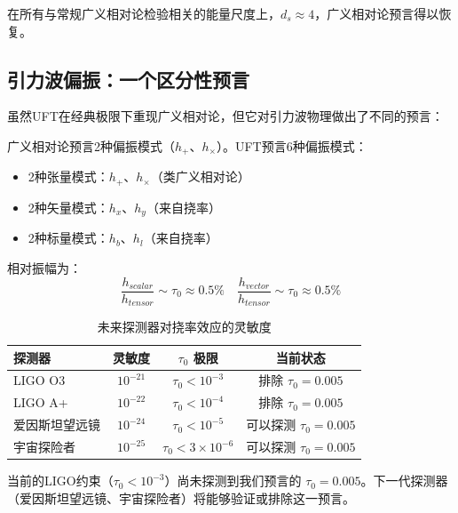 在所有与常规广义相对论检验相关的能量尺度上，$d_s \approx 4$，广义相对论预言得以恢复。

\subsection{引力波偏振：一个区分性预言}

虽然UFT在经典极限下重现广义相对论，但它对引力波物理做出了不同的预言：

\begin{theorem}[引力波偏振]
广义相对论预言2种偏振模式（$h_+$、$h_\times$）。UFT预言6种偏振模式：
\begin{itemize}
    \item 2种张量模式：$h_+$、$h_\times$（类广义相对论）
    \item 2种矢量模式：$h_x$、$h_y$（来自挠率）
    \item 2种标量模式：$h_b$、$h_l$（来自挠率）
\end{itemize}
\end{theorem}

相对振幅为：
\begin{equation}
    \frac{h_{scalar}}{h_{tensor}} \sim \tau_0 \approx 0.5\%
    \quad
    \frac{h_{vector}}{h_{tensor}} \sim \tau_0 \approx 0.5\%
\end{equation}

\begin{table}[htbp]
\centering
\caption{未来探测器对挠率效应的灵敏度}
\begin{tabular}{@{}lccc@{}}
\toprule
探测器 & 灵敏度 & $\tau_0$ 极限 & 当前状态 \\
\midrule
LIGO O3 & $10^{-21}$ & $\tau_0 < 10^{-3}$ & 排除 $\tau_0 = 0.005$ \\
LIGO A+ & $10^{-22}$ & $\tau_0 < 10^{-4}$ & 排除 $\tau_0 = 0.005$ \\
爱因斯坦望远镜 & $10^{-24}$ & $\tau_0 < 10^{-5}$ & 可以探测 $\tau_0 = 0.005$ \\
宇宙探险者 & $10^{-25}$ & $\tau_0 < 3\times 10^{-6}$ & 可以探测 $\tau_0 = 0.005$ \\
\bottomrule
\end{tabular}
\label{tab:gw_detectors}
\end{table}

\begin{remark}[实验前景]
当前的LIGO约束（$\tau_0 < 10^{-3}$）尚未探测到我们预言的 $\tau_0 = 0.005$。下一代探测器（爱因斯坦望远镜、宇宙探险者）将能够验证或排除这一预言。
\end{remark}

